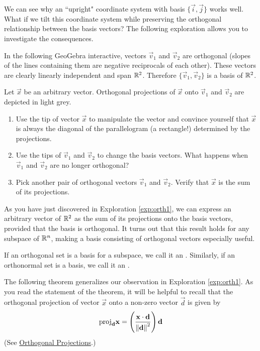 \documentclass{ximera}
\begin{document}
We can see why an ``upright" coordinate system with basis $\{\vec{i},\vec{j}\}$ works well.  What if we tilt this coordinate system while preserving the orthogonal relationship between the basis vectors?  The following exploration allows you to investigate the consequences.

\begin{exploration}\label{exp:orth1}
    In the following GeoGebra interactive, vectors $\vec{v}_1$ and $\vec{v}_2$ are orthogonal (slopes of the lines containing them are negative reciprocals of each other).  These vectors are clearly linearly independent and span $\mathbb{R}^2$.  Therefore $\{\vec{v}_1,\vec{v}_2\}$ is a basis of $\mathbb{R}^2$.  
    
    Let $\vec{x}$ be an arbitrary vector.  Orthogonal projections of $\vec{x}$ onto $\vec{v}_1$ and $\vec{v}_2$ are depicted in light grey.
    \begin{enumerate}
        \item Use the tip of vector $\vec{x}$ to manipulate the vector and convince yourself that $\vec{x}$ is always the diagonal of the parallelogram (a rectangle!) determined by the projections.
        \item Use the tips of $\vec{v}_1$ and $\vec{v}_2$ to change the basis vectors.  What happens when $\vec{v}_1$ and $\vec{v}_2$ are no longer orthogonal?
        \item Pick another pair of orthogonal vectors $\vec{v}_1$ and $\vec{v}_2$.  Verify that $\vec{x}$ is the sum of its projections.
    \end{enumerate}

    \begin{center}
\end{center}
\end{exploration}


As you have just discovered in Exploration \ref{exp:orth1}, we can express an arbitrary vector of $\mathbb{R}^2$ as the sum of its projections onto the basis vectors, provided that the basis is orthogonal. It turns out that this result holds for any subspace of $\mathbb{R}^n$, making a basis consisting of orthogonal vectors especially useful. 

If an orthogonal set is a basis for a subspace, we call it an
. Similarly, if an orthonormal set is a basis, we call it an .


The following theorem generalizes our observation in Exploration \ref{exp:orth1}.  As you read the statement of the theorem, it will be helpful to recall that the orthogonal projection of vector $\vec{x}$ onto a non-zero vector $\vec{d}$ is given by
\begin{equation}\label{eq:orthProj}
\mbox{proj}_{\mathbf{d}}\mathbf{x}=\left(\frac{\mathbf{x}\cdot\mathbf{d}}{\left\lVert\mathbf{d}\right\rVert^2}\right)\mathbf{d}
\end{equation}
(See \href{https://ximera.osu.edu/oerlinalg/LinearAlgebra/VEC-0070/main}{Orthogonal Projections}.)
\end{document}
